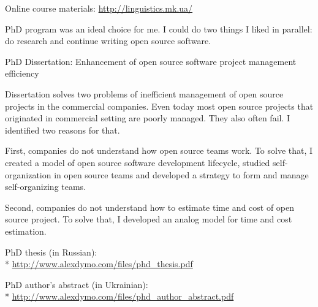 \documentclass[12pt]{letter}
\begin{document}
\begin{llist}
            \item Online course materials: \url{http://linguistics.mk.ua/}

  \endexperience




  \startexperience

            \item PhD program was an ideal choice for me. I could do two things I liked in parallel: do research and continue writing open source software.

            \item PhD Dissertation: Enhancement of open source software project management efficiency

            \item Dissertation solves two problems of inefficient management of open source projects in the commercial companies. Even today most open source projects that originated in commercial setting are poorly managed. They also often fail. I identified two reasons for that.

            \item First, companies do not understand how open source teams work. To solve that, I created a model of open source software development lifecycle, studied self-organization in open source teams and developed a strategy to form and manage self-organizing teams.

            \item Second, companies do not understand how to estimate time and cost of open source project. To solve that, I developed an analog model for time and cost estimation.

            \item PhD thesis (in Russian):\\*
            \url{http://www.alexdymo.com/files/phd_thesis.pdf}
            \item PhD author's abstract (in Ukrainian):\\* \url{http://www.alexdymo.com/files/phd_author_abstract.pdf}

  \endexperience



\end{llist}
\end{document}
